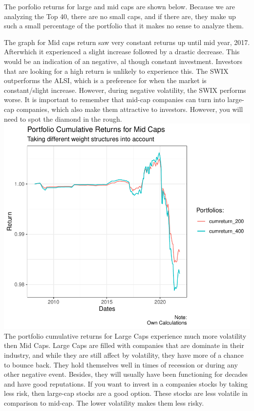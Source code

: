 \documentclass[11pt,preprint, authoryear]{elsarticle}
\numberwithin{equation}{section}
\numberwithin{figure}{section}
\numberwithin{table}{section}
\begin{document}
The porfolio returns for large and mid caps are shown below. Because we
are analyzing the Top 40, there are no small caps, and if there are,
they make up such a small percentage of the portfolio that it makes no
sense to analyze them.

The graph for Mid caps return saw very constant returns up until mid
year, 2017. Afterwhich it experienced a slight increase followed by a
drastic decrease. This would be an indication of an negative, al though
constant investment. Investors that are looking for a high return is
unlikely to experience this. The SWIX outperforms the ALSI, which is a
preference for when the market is constant/slight increase. However,
during negative volatility, the SWIX performs worse. It is important to
remember that mid-cap companies can turn into large-cap companies, which
also make them attractive to investors. However, you will need to spot
the diamond in the rough.
\includegraphics{Question2_files/figure-latex/unnamed-chunk-1-1.pdf} The
portfolio cumulative returns for Large Caps experience much more
volatility then Mid Caps. Large Caps are filled with companies that are
dominate in their industry, and while they are still affect by
volatility, they have more of a chance to bounce back. They hold
themselves well in times of recession or during any other negative
event. Besides, they will usually have been functioning for decades and
have good reputations. If you want to invest in a companies stocks by
taking less risk, then large-cap stocks are a good option. These stocks
are less volatile in comparison to mid-cap. The lower volatility makes
them less risky.
\end{document}
